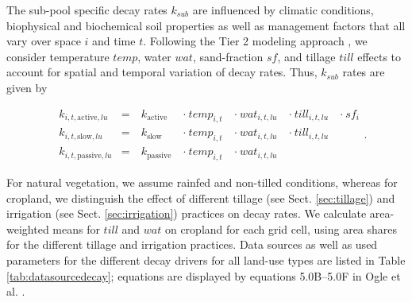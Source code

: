 \documentclass[gc, manuscript]{copernicus}
\begin{document}
The sub-pool specific decay rates \(k_{sub}\) are influenced by climatic conditions, biophysical and biochemical soil properties as well as management factors that all vary over space \(i\) and time \(t\). Following the Tier 2 modeling approach \citep{ogle_cropland_in_ipcc_2019}, we consider temperature \(temp\), water \(wat\), sand-fraction \(sf\), and tillage \(till\) effects to account for spatial and temporal variation of decay rates. Thus, \(k_{sub}\) rates are given by

\begin{equation}
\begin{aligned}
& k_{i,t,\mathrm{active},lu}  & = &~ k_{\mathrm{active}}  ~ &\cdot~ temp_{i,t} ~ &\cdot~ wat_{i,t,lu} ~ &\cdot~ till_{i,t,lu} ~ & \cdot~ sf_{i}\\
& k_{i,t,\mathrm{slow},lu}    & = &~ k_{\mathrm{slow}}    ~ &\cdot~ temp_{i,t} ~ &\cdot~ wat_{i,t,lu} ~ &\cdot~ till_{i,t,lu} ~ &\\
& k_{i,t,\mathrm{passive},lu} & = &~ k_{\mathrm{passive}} ~ &\cdot~ temp_{i,t} ~ &\cdot~ wat_{i,t,lu} ~ & ~ & 
\label{eq:decayrates}
\end{aligned}.
\end{equation}

For natural vegetation, we assume rainfed and non-tilled conditions, whereas for cropland, we distinguish the effect of different tillage (see Sect. \ref{sec:tillage}) and irrigation (see Sect. \ref{sec:irrigation}) practices on decay rates. We calculate area-weighted means for \(till\) and \(wat\) on cropland for each grid cell, using area shares for the different tillage and irrigation practices. Data sources as well as used parameters for the different decay drivers for all land-use types are listed in Table \ref{tab:datasourcedecay}; equations are displayed by equations 5.0B--5.0F in Ogle et al. \citeyearpar{ogle_cropland_in_ipcc_2019}.
\end{document}
